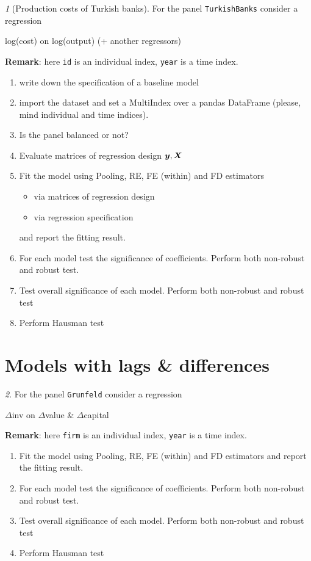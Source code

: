 \documentclass[12pt]{article}
\theoremstyle{remark}
\newtheorem{exercise}{}[section]
\begin{document}
\begin{exercise}[Production costs of Turkish banks]
For the panel \texttt{TurkishBanks} consider a regression
\begin{center}
	log(cost) on log(output) (+ another regressors)  
\end{center}
\textbf{Remark}: here \texttt{id} is an individual index, 
\texttt{year} is a time index.
\begin{enumerate}
	\item write down the specification of a baseline model
	\item import the dataset and set a MultiIndex over a pandas DataFrame 
	(please, mind  individual and time indices).
	\item Is the panel balanced or not?
	\item Evaluate matrices of regression design \({\bm y}, {\bm X}\)
	\item Fit the model using Pooling, RE, FE (within) and FD estimators
	\begin{itemize}
		\item via matrices of regression design
		\item via regression specification
	\end{itemize}
	and report the fitting result.
	\item For each model test the significance of coefficients. Perform both
	non-robust and robust test.
	\item Test overall significance of each model. Perform both
	non-robust and robust test
	\item Perform Hausman test
\end{enumerate}
\end{exercise}


\section{Models with lags \& differences}

\begin{exercise}
For the panel \texttt{Grunfeld} consider a regression
\begin{center}
	\(\Delta\)inv on \(\Delta\)value \& \(\Delta\)capital
\end{center}
\textbf{Remark}: here \texttt{firm} is an individual index, 
\texttt{year} is a time index.
\begin{enumerate}
	\item Fit the model using Pooling, RE, FE (within) and FD estimators
	and report the fitting result.
	\item For each model test the significance of coefficients. Perform both
	non-robust and robust test.
	\item Test overall significance of each model. Perform both
	non-robust and robust test
	\item Perform Hausman test
\end{enumerate}
\end{exercise}
\end{document}
